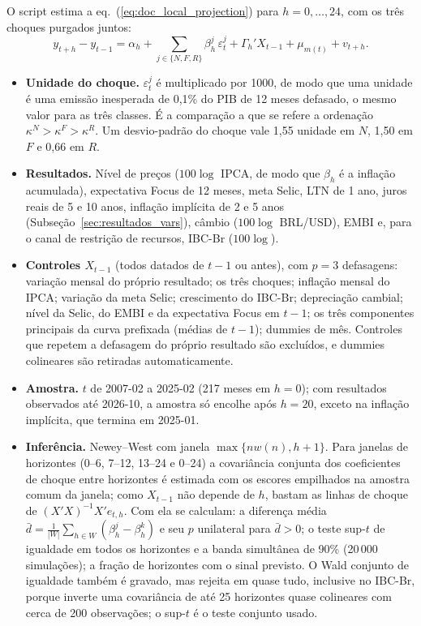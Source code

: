 \documentclass[12pt,a4paper]{article}
\begin{document}
O script  estima a eq.~(\ref{eq:doc_local_projection})
para \(h=0,\ldots,24\), com os três choques purgados juntos:
\[
y_{t+h}-y_{t-1}=\alpha_h+\sum_{j\in\{N,F,R\}}\beta_h^j\,\varepsilon_t^j
+\Gamma_h'X_{t-1}+\mu_{m(t)}+v_{t+h}.
\]
\begin{itemize}[leftmargin=1.2cm]
    \item \textbf{Unidade do choque.} \(\varepsilon_t^j\) é multiplicado por 1000, de
    modo que uma unidade é uma emissão inesperada de 0,1\% do PIB de 12 meses
    defasado, o mesmo valor para as três classes. É a comparação a que se refere a
    ordenação \(\kappa^N>\kappa^F>\kappa^R\). Um desvio-padrão do choque vale 1,55
    unidade em \(N\), 1,50 em \(F\) e 0,66 em \(R\).
    \item \textbf{Resultados.} Nível de preços (\(100\log\) IPCA, de modo que
    \(\beta_h\) é a inflação acumulada), expectativa Focus de 12 meses, meta Selic,
    LTN de 1 ano, juros reais de 5 e 10 anos, inflação implícita de 2 e 5 anos
    (Subseção~\ref{sec:resultados_vars}),
    câmbio (\(100\log\) BRL/USD), EMBI e, para o canal de restrição de recursos,
    IBC-Br (\(100\log\)).
    \item \textbf{Controles \(X_{t-1}\)} (todos datados de \(t-1\) ou antes), com
    \(p=3\) defasagens: variação mensal do próprio resultado; os três choques; inflação
    mensal do IPCA; variação da meta Selic; crescimento do IBC-Br; depreciação
    cambial; nível da Selic, do EMBI e da expectativa Focus em \(t-1\); os três
    componentes principais da curva prefixada (médias de \(t-1\)); dummies de mês.
    Controles que repetem a defasagem do próprio resultado são excluídos, e
    dummies colineares são retiradas automaticamente.
    \item \textbf{Amostra.} \(t\) de 2007-02 a 2025-02 (217 meses em \(h=0\)); com
    resultados observados até 2026-10, a amostra só encolhe após \(h=20\), exceto
    na inflação implícita, que termina em 2025-01.
    \item \textbf{Inferência.} Newey--West com janela \(\max\{nw(n),h+1\}\). Para
    janelas de horizontes (0--6, 7--12, 13--24 e 0--24) a covariância conjunta dos
    coeficientes de choque entre horizontes é estimada com os escores empilhados na
    amostra comum da janela; como \(X_{t-1}\) não depende de \(h\), bastam as linhas
    de choque de \((X'X)^{-1}X'e_{t,h}\). Com ela se calculam: a diferença média
    \(\bar d=\frac{1}{|W|}\sum_{h\in W}(\beta_h^{j}-\beta_h^{k})\) e seu \(p\)
    unilateral para \(\bar d>0\); o teste sup-\(t\) de igualdade em todos os horizontes
    e a banda simultânea de 90\% (20\,000 simulações); a fração de horizontes com
    o sinal previsto. O Wald conjunto de igualdade também é gravado, mas
    rejeita em quase tudo, inclusive no IBC-Br, porque inverte uma covariância de
    até 25 horizontes quase colineares com cerca de 200 observações; o sup-\(t\) é
    o teste conjunto usado.
\end{itemize}
\end{document}
